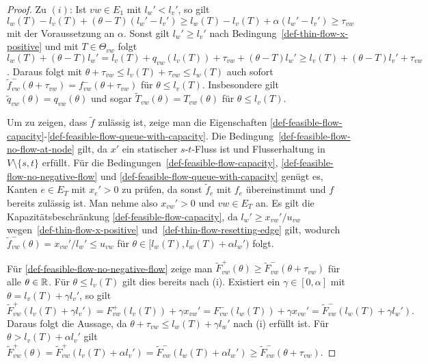 \begin{proof}
	Zu $(i)$: Ist $vw\in E_1$ mit $l_w'<l_v'$, so gilt
	$l_w(T)-l_v(T) + (\theta - T)(l_w' - l_v') \geq l_w(T)-l_v(T)+\alpha(l_w'- l_v')\geq \tau_{vw}$  mit der Voraussetzung an $\alpha$.
	Sonst gilt $l_w' \geq l_v'$ nach Bedingung~\ref{def-thin-flow-x-positive} und mit $T\in \Theta_{vw}$ folgt $l_w(T)+(\theta-T)l_w'=l_v(T) + q_{vw}(l_v(T))+\tau_{vw}+(\theta - T)l_w' \geq l_v(T) + (\theta-T)l_v'+\tau_{vw}$.
	Daraus folgt mit $\theta + \tau_{vw} \leq l_v(T) + \tau_{vw} \leq l_w(T)$ auch sofort $\tilde{f}_{vw}^-(\theta + \tau_{vw}) = f_{vw}^-(\theta + \tau_{vw})$ für $\theta\leq l_v(T)$.
	Insbesondere gilt $\tilde{q}_{vw}(\theta) = q_{vw}(\theta)$ und sogar $ \tilde{T}_{vw}(\theta)= T_{vw}(\theta)$ für $\theta \leq l_v(T)$.
	
	Um zu zeigen, dass $\tilde{f}$ zulässig ist, zeige man die Eigenschaften \ref{def-feasible-flow-capacity}-\ref{def-feasible-flow-queue-with-capacity}.
	Die Bedingung~\ref{def-feasible-flow-no-flow-at-node} gilt, da $x'$ ein statischer $s$-$t$-Fluss ist und Flusserhaltung in $V\setminus \{ s, t \}$ erfüllt.
	Für die Bedingungen~\ref{def-feasible-flow-capacity}, \ref{def-feasible-flow-no-negative-flow} und \ref{def-feasible-flow-queue-with-capacity} genügt es, Kanten $e\in E_T$ mit $x_e' > 0$ zu prüfen, da sonst $\tilde{f}_e$ mit $f_e$ übereinstimmt und $f$ bereits zulässig ist.
	Man nehme also $x_{vw}' > 0$ und $vw\in E_T$ an.
	Es gilt die Kapazitätsbeschränkung \ref{def-feasible-flow-capacity}, da $l_w'\geq x_{vw}' / u_{vw}$ wegen~\ref{def-thin-flow-x-positive} und~\ref{def-thin-flow-resetting-edge} gilt, wodurch $\tilde{f}^-_{vw}(\theta)=x_{vw}'/l_w'\leq u_{vw}$ für $\theta\in[l_w(T), l_w(T)+\alpha l_w')$ folgt.
	
	Für \ref{def-feasible-flow-no-negative-flow} zeige man $\tilde{F}^+_{vw}(\theta)\geq \tilde{F}_{vw}^-(\theta+\tau_{vw})$ für alle $\theta\in\mathbb{R}$.
	Für $\theta\leq l_v(T)$ gilt dies bereits nach (i).
	Existiert ein $\gamma\in[0, \alpha]$ mit $\theta=l_v(T) + \gamma l_v'$, so gilt
	\[
	\tilde{F}_{vw}^+(l_v(T) + \gamma l_v')=F_{vw}^+(l_v(T))+\gamma x_{vw}' = F_{vw}^-(l_w(T))+ \gamma x_{vw}'= \tilde{F}_{vw}^-(l_w(T)+\gamma l_w').
	\]
	Daraus folgt die Aussage, da $\theta + \tau_{vw}\leq l_w(T) + \gamma l_w'$ nach (i) erfüllt ist.
	Für $\theta > l_v(T)+\alpha l_v'$ gilt $\tilde{F}_{vw}^+(\theta) = \tilde{F}_{vw}^+(l_v(T) + \alpha l_v') = \tilde{F}_{vw}^-(l_w(T) + \alpha l_w') \geq \tilde{F}_{vw}^-(\theta + \tau_{vw})$.
	

\end{proof}
